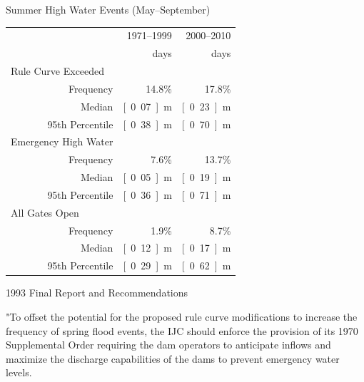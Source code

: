\documentclass[compress,english]{beamer}
\begin{document}
{{{{{{%
\begin{frame}{Summer High Water Events (May--September)}
\vfill
\hfill\begin{tabular}{lrrr}\toprule
\qquad\qquad\qquad\quad & & 1971--1999 & 2000--2010	\\
& & \unit[4437]{days} & \unit[1683]{days} \\
\midrule
\multicolumn{2}{l}{Rule Curve Exceeded} & & \\
& Frequency & 14.8\% & 17.8\% \\
& Median & \unit[0.07]{m} & \unit[0.23]{m}\\
& 95th Percentile & \unit[0.38]{m} & \unit[0.70]{m}\\
\midrule
\multicolumn{2}{l}{Emergency High Water} & & \\
& Frequency & 7.6\% & 13.7\%\\
& Median & \unit[0.05]{m} & \unit[0.19]{m} \\
& 95th Percentile & \unit[0.36]{m} & \unit[0.71]{m} \\
\midrule
\multicolumn{2}{l}{All Gates Open} & &\\
& Frequency & 1.9\% & 8.7\% \\
& Median & \unit[0.12]{m} & \unit[0.17]{m}\\
& 95th Percentile & \unit[0.29]{m} & \unit[0.62]{m} \\
\midrule
\end{tabular}\hfill

\vspace*{3mm}
\vfill

\end{frame}


\begin{frame}{1993 Final Report and Recommendations}

"{\color{red}To offset the potential for the proposed rule curve modifications to increase the frequency of spring flood events}, the IJC should enforce the provision of its 1970 Supplemental Order {\color{red} requiring the dam operators to anticipate inflows and maximize the discharge capabilities of the dams to prevent emergency water levels}. 

\vfill


\end{frame}}}}}}}
\end{document}
